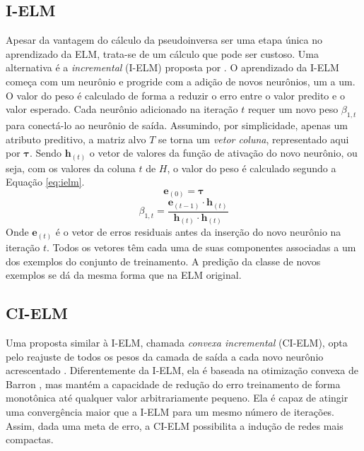 \subsection{I-ELM}\label{ielm}
Apesar da vantagem do cálculo da pseudoinversa ser uma etapa única no
aprendizado da ELM, trata-se de um cálculo que pode ser custoso.
Uma alternativa é a \elm \textit{incremental} (I-ELM) proposta por
\cite{journals/tnn/HuangCS06}.
O aprendizado da I-ELM começa com um neurônio e
progride com a adição de novos neurônios, um a um.
O valor do peso é calculado de forma a reduzir o erro entre o
valor predito e o valor esperado.
Cada neurônio adicionado na iteração $t$ requer um novo peso $\beta_{1,t}$
para conectá-lo ao neurônio de saída.
Assumindo, por simplicidade, apenas um atributo preditivo,
a matriz alvo $T$ se torna um \textit{vetor coluna}, representado aqui por $\bm{\tau}$.
Sendo $\bm{h}_{(t)}$ o vetor de valores da função de ativação do novo neurônio,
ou seja, com os valores da coluna $t$ de $H$,
o valor do peso é calculado segundo a Equação \ref{eq:ielm}.
\begin{equation}\label{eq:ielm0}
\bm{e}_{(0)} = \bm{\tau}
\end{equation}
\begin{equation}\label{eq:ielm}
\beta_{1,t}=\frac{\bm{e}_{(t-1)}\cdot \bm{h}_{(t)}}
{\bm{h}_{(t)}\cdot \bm{h}_{(t)}}
\end{equation}
Onde $\bm{e}_{(t)}$ é o vetor de erros residuais antes da inserção do
novo neurônio na iteração $t$.
Todos os vetores têm cada uma de suas componentes associadas a um dos exemplos do conjunto de treinamento.
A predição da classe de novos exemplos se dá da mesma forma que na ELM original.

\subsection{CI-ELM}
Uma proposta similar à I-ELM, chamada \textit{convexa incremental} (CI-ELM),
opta pelo reajuste de todos os pesos da camada de saída a cada novo neurônio
acrescentado \citep{journals/ijon/HuangC07}.
Diferentemente da I-ELM, ela é baseada na otimização convexa de Barron
\citep{journals/tit/Barron93}, mas mantém a capacidade de redução do erro
treinamento de forma monotônica até qualquer valor arbitrariamente pequeno.
Ela é capaz de atingir uma convergência maior que a I-ELM
para um mesmo número de iterações.
Assim, dada uma meta de erro, a CI-ELM possibilita a indução de redes mais compactas.

